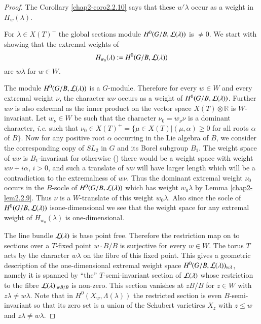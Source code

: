 \begin{proof}
The Corollary \ref{chap2-coro2.2.10} says that these $w'\lambda$ occur
as a weight in $H_{w}(\lambda)$. 

For $\lambda\in X(T)^{-}$ the global sections module
$H^{0}(G/B,\mathcal{L}(\lambda))$ is $\neq 0$. We start with showing that the
extremal weights of 
$$
H_{w_{0}}(\lambda):=H^{0}(G/B,\mathcal{L}(\lambda))
$$ 
are $w\lambda$ for $w\in W$.

The module $H^{0}(G/B,\mathcal{L}(\lambda))$ is a $G$-module. Therefore for
every $w\in W$ and every extremal weight 
$\nu$, the character $w\nu$
occurs as a weight of $H^{0}(G/B,\mathcal{L}(\lambda))$. Further $w\nu$ is also
extremal as the inner product on the vector space $X(T)\otimes
\mathbb{R}$ is $W$-invariant. Let $w_{\nu}\in W$ be such that the
character $\nu_{0}=w_{\nu}\nu$ is a dominant 
character, {\em i.e.}
such that $\nu_{0}\in X(T)^{+}=\{\mu\in X(T)|(\mu,\alpha)\geq 0$ for
all roots $\alpha$ of $B\}$. Now for any positive root $\alpha$
occurring in the Lie algebra of $B$, we consider the corresponding
copy of $SL_{2}$ in $G$ and its Borel subgroup $B_{1}$. The weight
space of $w\nu$ is $B_{1}$-invariant for otherwise (\cite[31.1]{key9})
there would be a weight space with weight $w\nu+i\alpha$, $i>0$, and
such a translate of $w\nu$ will have larger length which will be a
contradiction to the extremalness of $w\nu$. Thus the dominant
extremal weight $\nu_{0}$ occurs in the $B$-socle of
$H^{0}(G/B,\mathcal{L}(\lambda))$ which has weight $w_{0}\lambda$ by Lemma
\ref{chap2-lem2.2.9}. Thus $\nu$ is a $W$-translate of this weight
$w_{0}\lambda$. Also since the socle of $H^{0}(G/B,\mathcal{L}(\lambda))$
is\pageoriginale one-dimensional\label{page18} we see that the weight space for any
extremal weight of $H_{w_{0}}(\lambda)$ is one-dimensional.

The line bundle $\mathcal{L}(\lambda)$ is base point free. Therefore the
restriction map on to sections over a $T$-fixed point $w\cdot B/B$ is
surjective for every $w\in W$. The torus $T$ acts by the character
$w\lambda$ on the fibre of this fixed point. This gives a geometric
description of the one-dimensional extremal 
weight space
$H^{0}(G/B,\mathcal{L}(\lambda))_{w\lambda}$, namely it is spanned by ``the''
$T$-semi-invariant 
section of $\mathcal{L}(\lambda)$ whose restriction to the
fibre $\mathcal{L}(\lambda)|_{wB/B}$ is non-zero. This section vanishes at
$zB/B$ for $z\in W$ with $z\lambda\neq w\lambda$. Note that in
$H^{0}(X_{w},\Lambda(\lambda))$ the restricted section is even
$B$-semi-invariant so that its zero set is a union of the Schubert
varietires $X_{z}$ with $z\leq w$ and $z\lambda\neq w\lambda$.


\end{proof}
